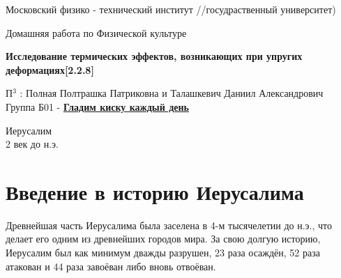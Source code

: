 \documentclass[a4paper,12pt]{article}
\begin{document}
\begin{titlepage}

\newpage
\begin{center}
\normalsize Московский физико - технический институт //госудраственный университет)
\end{center}

\vspace{6em}

\begin{center}
\Large Домашняя работа по Физической культуре\\
\end{center}

\vspace{1em}

\begin{center}
\large \textbf{ Исследование термических эффектов,
возникающих при упругих деформациях[2.2.8] }
\end{center}

\vspace{2em}

\begin{center}
\large П$ ^ 3$ : Полная Полтрашка Патриковна и Талашкевич Даниил Александрович \\
Группа Б01 - \href{ https://vk.com/rt_kiska }{\textbf{Гладим киску каждый день}}
\end{center}

\vspace{\fill}

\begin{center}
    \large Иерусалим \\ 2 век до н.э.
\end{center}

\end{titlepage}



    \thispagestyle{empty}
    \newpage
    \tableofcontents
    \newpage
    \setcounter{page}{1}


\section{Введение в историю Иерусалима}

Древнейшая часть Иерусалима была заселена в 4-м тысячелетии до н.э., что делает его одним из древнейших городов мира. За свою долгую историю, Иерусалим был как минимум дважды разрушен, 23 раза осаждён, 52 раза атакован и 44 раза завоёван либо вновь отвоёван.
\end{document}
